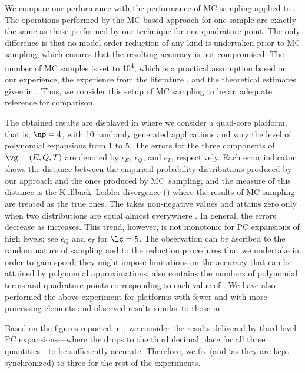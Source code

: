 We compare our performance with the performance of \ac{MC} sampling applied to
. The operations performed by the
\ac{MC}-based approach for one sample are exactly the same as those performed by
our technique for one quadrature point. The only difference is that no model
order reduction of any kind is undertaken prior to \ac{MC} sampling, which
ensures that the resulting accuracy is not compromised. The number of \ac{MC}
samples is set to 10\textsuperscript{4}, which is a practical assumption based
on our experience, the experience from the literature \cite{xiang2010, juan2012,
lee2013}, and the theoretical estimates given in \cite{diaz-emparanza2002}.
Thus, we consider this setup of \ac{MC} sampling to be an adequate reference for
comparison.

The obtained results are displayed in  where
we consider a quad-core platform, that is, $\np = 4$, with 10 randomly generated
applications and vary the level of polynomial expansions \lc from 1 to 5. The
errors for the three components of $\vg = (E, Q, T)$ are denoted by
$\epsilon_E$, $\epsilon_Q$, and $\epsilon_T$, respectively. Each error indicator
shows the distance between the empirical probability distributions produced by
our approach and the ones produced by \ac{MC}\ sampling, and the measure of this
distance is the Kullback--Leibler divergence () \cite{gelman2013,
hastie2013} where the results of \ac{MC} sampling are treated as the true ones.
The  takes non-negative values and attains zero only when two
distributions are equal almost everywhere \cite{durrett2010}. In general, the
errors decrease as \lc increases. This trend, however, is not monotonic for
\ac{PC} expansions of high levels; see $\epsilon_Q$ and $\epsilon_T$ for $\lc =
5$. The observation can be ascribed to the random nature of sampling and to the
reduction procedures that we undertake in order to gain speed; they might impose
limitations on the accuracy that can be attained by polynomial approximations.
 also contains the numbers of polynomial terms
\nc and quadrature points \nq corresponding to each value of \lc. We have also
performed the above experiment for platforms with fewer and with more processing
elements and observed results similar to those in
.

Based on the figures reported in , we consider
the results delivered by third-level \ac{PC} expansions---where the 
drops to the third decimal place for all three quantities---to be sufficiently
accurate. Therefore, we fix \lc (and \lq as they are kept synchronized) to three
for the rest of the experiments.

